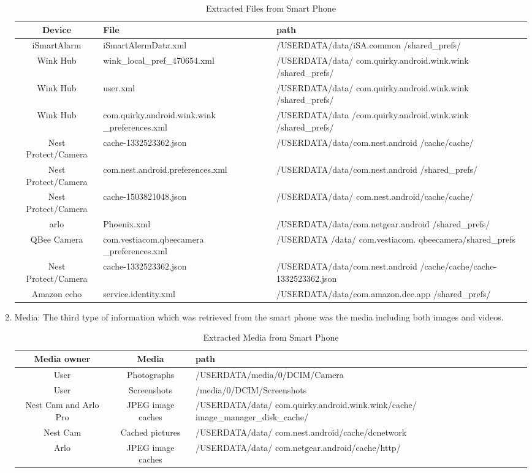 \documentclass{easychair}
\begin{document}
\begin{enumerate}
\begin{table}[]
\begin{tabular}{|c|m{5cm}|m{6.3cm}|}
\hline
Device & File & path\\
\hline
iSmartAlarm & iSmartAlermData.xml & 	/USERDATA/data/iSA.common
/shared\_prefs/\\
\hline
Wink Hub & wink\_local\_pref\_470654.xml & 	/USERDATA/data/
com.quirky.android.wink.wink
/shared\_prefs/\\
\hline
Wink Hub & user.xml & /USERDATA/data/
com.quirky.android.wink.wink
/shared\_prefs/\\
\hline
Wink Hub & com.quirky.android.wink.wink
\_preferences.xml	& /USERDATA/data
/com.quirky.android.wink.wink
/shared\_prefs/\\
\hline
Nest Protect/Camera	& cache-1332523362.json & /USERDATA/data/com.nest.android
/cache/cache/\\
\hline
Nest Protect/Camera	& com.nest.android.preferences.xml & /USERDATA/data/com.nest.android
/shared\_prefs/\\
\hline
Nest Protect/Camera	& cache-1503821048.json & /USERDATA/data/
com.nest.android/cache/cache/\\
\hline
arlo & Phoenix.xml & /USERDATA/data/com.netgear.android
/shared\_prefs/\\
\hline
QBee Camera & com.vestiacom.qbeecamera
\_preferences.xml & /USERDATA /data/
com.vestiacom. qbeecamera/shared\_prefs\\
\hline
Nest Protect/Camera	& cache-1332523362.json & /USERDATA/data/com.nest.android
/cache/cache/cache-1332523362.json\\
\hline
Amazon echo & service.identity.xml & /USERDATA/data/com.amazon.dee.app
/shared\_prefs/\\
\hline
\end{tabular}
 \caption{Extracted Files from Smart Phone}
   \label{tab:my_label}
\end{table}

\item Media:
The third type of information which was retrieved from the smart phone was the media including both images and videos.\\
\begin{table}[]
\begin{tabular}{|c|c|m{6.3cm}|}							 
\hline
Media owner & Media & path\\
\hline
User & Photographs & /USERDATA/media/0/DCIM/Camera\\
\hline
User & Screenshots & /media/0/DCIM/Screenshots\\
\hline
Nest Cam and Arlo Pro	& JPEG image caches	& /USERDATA/data/
com.quirky.android.wink.wink/cache/
image\_manager\_disk\_cache/\\
\hline
Nest Cam & Cached pictures & /USERDATA/data/
com.nest.android/cache/dcnetwork\\
\hline
Arlo & JPEG image caches & /USERDATA/data/
com.netgear.android/cache/http/\\
\hline
\end{tabular}
 \caption{Extracted Media from Smart Phone}
   \label{tab:my_label}
\end{table}


\end{enumerate}
\end{document}

